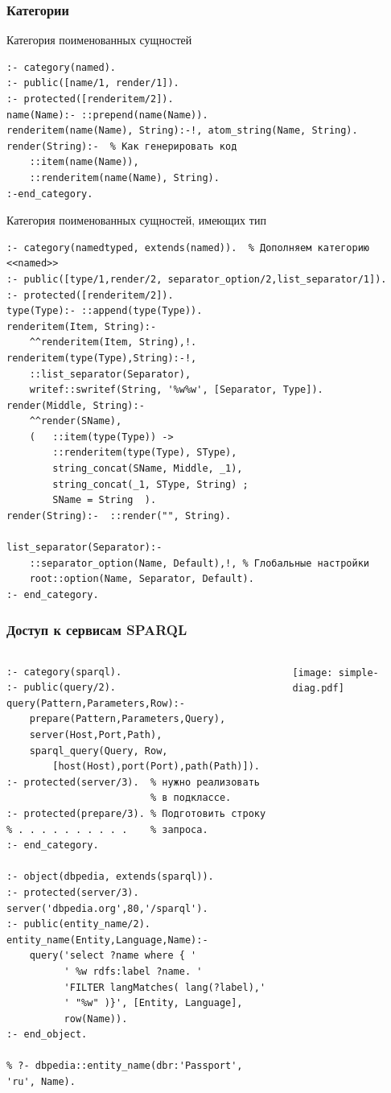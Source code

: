 \documentclass[10pt]{beamer}
\begin{document}
\begin{frame}[fragile]
  \frametitle{Категории}
  Категория поименованных сущностей
\begin{verbatim}
:- category(named).
:- public([name/1, render/1]).
:- protected([renderitem/2]).
name(Name):- ::prepend(name(Name)).
renderitem(name(Name), String):-!, atom_string(Name, String).
render(String):-  % Как генерировать код
    ::item(name(Name)),
    ::renderitem(name(Name), String).
:-end_category.
\end{verbatim}
Категория поименованных сущностей, имеющих тип
\begin{verbatim}
:- category(namedtyped, extends(named)).  % Дополняем категорию <<named>>
:- public([type/1,render/2, separator_option/2,list_separator/1]).
:- protected([renderitem/2]).
type(Type):- ::append(type(Type)).
renderitem(Item, String):-
    ^^renderitem(Item, String),!.
renderitem(type(Type),String):-!,
    ::list_separator(Separator),
    writef::swritef(String, '%w%w', [Separator, Type]).
render(Middle, String):-
    ^^render(SName),
    (   ::item(type(Type)) ->
        ::renderitem(type(Type), SType),
        string_concat(SName, Middle, _1),
        string_concat(_1, SType, String) ;
        SName = String  ).
render(String):-  ::render("", String).

list_separator(Separator):-
    ::separator_option(Name, Default),!, % Глобальные настройки
    root::option(Name, Separator, Default).
:- end_category.

\end{verbatim}
\end{frame}

\begin{frame}[fragile]
  \frametitle{Доступ к сервисам SPARQL}

  \begin{columns}
\begin{column}{0.5\textwidth}
\begin{verbatim}
:- category(sparql).
:- public(query/2).
query(Pattern,Parameters,Row):-
    prepare(Pattern,Parameters,Query),
    server(Host,Port,Path),
    sparql_query(Query, Row,
        [host(Host),port(Port),path(Path)]).
:- protected(server/3).  % нужно реализовать
                         % в подклассе.
:- protected(prepare/3). % Подготовить строку
% . . . . . . . . . .    % запроса.
:- end_category.

:- object(dbpedia, extends(sparql)).
:- protected(server/3).
server('dbpedia.org',80,'/sparql').
:- public(entity_name/2).
entity_name(Entity,Language,Name):-
    query('select ?name where { '
          ' %w rdfs:label ?name. '
          'FILTER langMatches( lang(?label),'
          ' "%w" )}', [Entity, Language],
          row(Name)).
:- end_object.

% ?- dbpedia::entity_name(dbr:'Passport', 'ru', Name).
\end{verbatim}
\end{column}
\begin{column}{0.5\textwidth}
  \flushright
\texttt{[image: simple-diag.pdf]}
\end{column}
\end{columns}
\end{frame}
\end{document}
